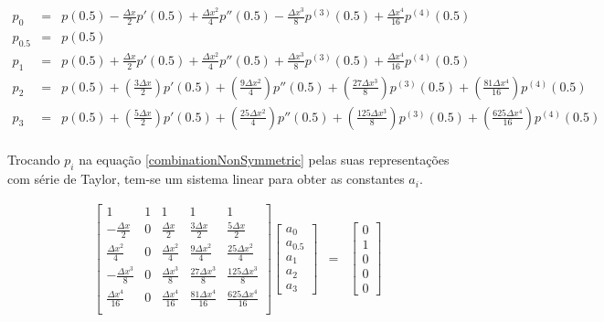 \documentclass[introducao.tex]{subfiles}
\begin{document}
\begin{eqnarray}
p_0 & = & p(0.5) - \frac{\Delta x}{2}p'(0.5) + \frac{\Delta x^2}{4}p''(0.5) - \frac{\Delta x^3}{8} p^{(3)}(0.5) + \frac{\Delta x^4}{16} p^{(4)}(0.5) \nonumber\\
p_{0.5} & = & p(0.5) \nonumber \\
p_1 & = & p(0.5) + \frac{\Delta x}{2}p'(0.5) + \frac{\Delta x^2}{4}p''(0.5) + \frac{\Delta x^3}{8} p^{(3)}(0.5) + \frac{\Delta x^4}{16} p^{(4)}(0.5)\nonumber \\
p_2 & = & p(0.5) + \left(\frac{3\Delta x}{2}\right)p'(0.5) + \left(\frac{9\Delta x^2}{4}\right)p''(0.5) + \left(\frac{27\Delta x^3}{8}\right)p^{(3)}(0.5)+\left(\frac{81\Delta x^4}{16}\right)p^{(4)}(0.5)\nonumber\\
p_3 & = & p(0.5) + \left(\frac{5\Delta x}{2}\right)p'(0.5) + \left(\frac{25\Delta x^2}{4}\right)p''(0.5) + \left(\frac{125\Delta x^3}{8}\right)p^{(3)}(0.5)+\left(\frac{625\Delta x^4}{16}\right)p^{(4)}(0.5)\nonumber
\end{eqnarray}
 
\paragraph{} Trocando $p_i$ na equação \ref{combinationNonSymmetric} pelas suas representações com série de Taylor, tem-se um sistema linear para obter as constantes $a_i$.

\begin{eqnarray}
\left[\begin{array}{ccccc}
1 & 1 & 1 & 1 & 1\\
-\frac{\Delta x}{2} & 0 & \frac{\Delta x}{2} & \frac{3\Delta x}{2} & \frac{5\Delta x}{2}\\
\frac{\Delta x^2}{4} & 0 & \frac{\Delta x^2}{4} & \frac{9\Delta x^2}{4} & \frac{25\Delta x^2}{4}\\
-\frac{\Delta x^3}{8} & 0 & \frac{\Delta x^3}{8} & \frac{27\Delta x^3}{8} & \frac{125\Delta x^3}{8}\\
\frac{\Delta x^4}{16} & 0 & \frac{\Delta x^4}{16} & \frac{81\Delta x^4}{16} & \frac{625\Delta x^4}{16}\\
\end{array}\right]\left[\begin{array}{c}a_0\\ a_{0.5}\\ a_1\\ a_2\\ a_3\end{array}\right] & = & \left[\begin{array}{c}0\\ 1\\ 0\\ 0\\ 0\end{array}\right]
\end{eqnarray}
\end{document}
